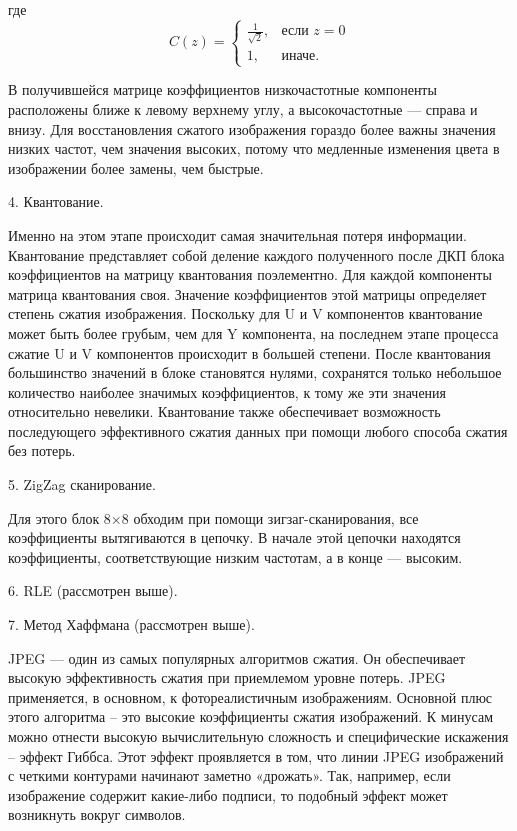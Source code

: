  	где 
 	\begin{equation}
 	C(z) = \begin{cases}
 		\frac{1}{\sqrt{2}},  & \mbox{если } z = 0 \\
 		1, &  \mbox{иначе.}
 	\end{cases} 
 	\end{equation}
 	
 
 	В получившейся матрице коэффициентов низкочастотные компоненты расположены ближе к левому верхнему углу, а высокочастотные --- справа и внизу. Для восстановления сжатого изображения гораздо более важны значения низких частот, чем значения высоких, потому что медленные изменения цвета в изображении более замены, чем быстрые.

	4. Квантование.
	
	Именно на этом этапе происходит самая значительная потеря информации. Квантование представляет собой деление каждого полученного после ДКП блока коэффициентов на матрицу квантования поэлементно. Для каждой компоненты матрица квантования своя. Значение коэффициентов этой матрицы определяет степень сжатия изображения. Поскольку для U и V компонентов квантование может быть более грубым, чем для Y компонента, на последнем этапе процесса сжатие U и V компонентов происходит в большей степени. После квантования большинство значений в блоке становятся нулями, сохранятся только небольшое количество наиболее значимых коэффициентов, к тому же эти значения относительно невелики. Квантование также обеспечивает возможность последующего эффективного сжатия данных при помощи любого способа сжатия без потерь.
	
	5. ZigZag сканирование.
	
	Для этого блок 8×8 обходим при помощи зигзаг-сканирования, все коэффициенты вытягиваются в цепочку. В начале этой цепочки находятся коэффициенты, соответствующие низким частотам, а в конце --- высоким. 
	
	6. RLE (рассмотрен выше). 
	
	7. Метод Хаффмана (рассмотрен выше).
	
	
	JPEG --- один из самых популярных алгоритмов сжатия. Он обеспечивает высокую
	эффективность сжатия при приемлемом уровне потерь. JPEG применяется, в основном,
	к фотореалистичным изображениям. Основной плюс этого алгоритма – это высокие коэффициенты сжатия изображений. К минусам можно отнести высокую вычислительную сложность и специфические искажения – эффект Гиббса. Этот эффект проявляется
	в том, что линии JPEG изображений с четкими контурами начинают заметно «дрожать». Так, например, если изображение содержит какие-либо подписи, то подобный
	эффект может возникнуть вокруг символов.
	
